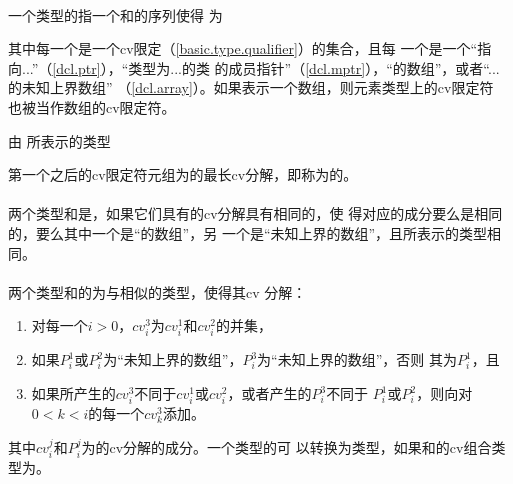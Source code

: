 \paragraph{} %
一个类型的指一个和的序列使得
为                                                                          \par
\mbox{}                   \par
其中每一个是一个cv限定（\ref{basic.type.qualifier}）的集合，且每
一个是一个“指向...”（\ref{dcl.ptr}），“类型为...的类
的成员指针”（\ref{dcl.mptr}），“的数组”，或者“...的未知上界数组”
（\ref{dcl.array}）。如果表示一个数组，则元素类型上的cv限定符
也被当作数组的cv限定符。

\begin{example}
  由 所表示的类型
\end{example}

第一个之后的cv限定符元组为的最长cv分解，即称为的。

\paragraph{} %
两个类型和是，如果它们具有的cv分解具有相同的，使
得对应的成分要么是相同的，要么其中一个是“的数组”，另
一个是“未知上界的数组”，且所表示的类型相同。

\paragraph{} %
两个类型和的为与相似的类型，使得其cv
分解：
\begin{enumerate}
  \item 对每一个$i > 0$，$cv^3_i$为$cv^1_i$和$cv^2_i$的并集，
  \item 如果$P^1_i$或$P^2_i$为“未知上界的数组”，$P^3_i$为“未知上界的数组”，否则
        其为$P^1_i$，且
  \item 如果所产生的$cv^3_i$不同于$cv^1_i$或$cv^2_i$，或者产生的$P^3_i$不同于
        $P^1_i$或$P^2_i$，则向对$0 < k < i$的每一个$cv^3_k$添加。
\end{enumerate}
其中$cv^j_i$和$P^j_i$为的cv分解的成分。一个类型的\prvalue{}可
以转换为类型，如果和的cv组合类型为。

